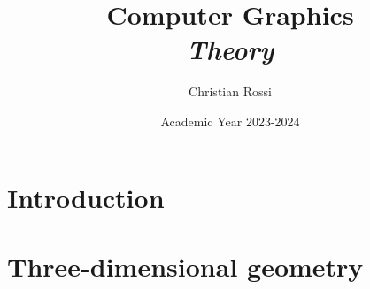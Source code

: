 \documentclass[12pt, a4paper]{report}
\title{Computer Graphics \\ \textit{Theory}}
\author{Christian Rossi}
\date{Academic Year 2023-2024}
\begin{document}
    \maketitle

    

    \cleardoublepage

    \tableofcontents

    \cleardoublepage

    \chapter{Introduction}
    
    
    

    \chapter{Three-dimensional geometry}
    
    
    
    
    




    
\end{document}

